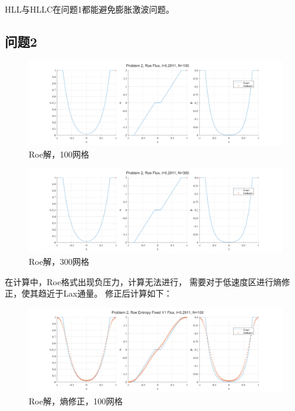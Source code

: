 \documentclass[UTF8,zihao=5]{ctexart} %
\begin{document}
HLL与HLLC在问题1都能避免膨胀激波问题。

\subsection{问题2}

\begin{figure}[H]
    \centering
    \includegraphics[width=18cm]{p2_Roe_N100.png}  %
    \caption{Roe解，100网格}
\end{figure}

\begin{figure}[H]
    \centering
    \includegraphics[width=18cm]{p2_Roe_N300.png}  %
    \caption{Roe解，300网格}
\end{figure}

在计算中，Roe格式出现负压力，计算无法进行，
需要对于低速度区进行熵修正，使其趋近于Lax通量。
修正后计算如下：

\begin{figure}[H]
    \centering
    \includegraphics[width=18cm]{p2_Roe Entropy Fixed V1_N100.png}  %
    \caption{Roe解，熵修正，100网格}
\end{figure}
\end{document}
